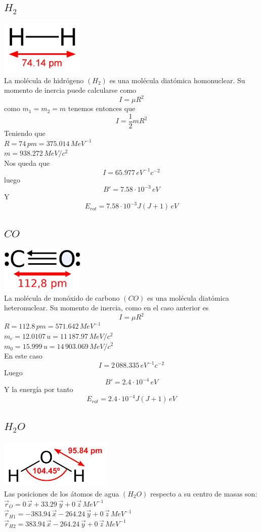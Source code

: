 \documentclass[a4paper]{article}
\begin{document}
\subsection{$H_2$}
\includegraphics[width=0.3\textwidth]{hidrogeno.png}\\
La molécula de hidrógeno $(H_2)$ es una molécula diatómica homonuclear. Su momento de inercia puede calcularse como $$I=\mu R^2$$
como $m_1=m_2=m$ tenemos entonces que $$I=\frac{1}{2}mR^2$$
Teniendo que\\
 $R=74 \, pm=375.014 \, MeV^{-1}$\\
 $m=938.272 \, MeV/c^2$\\
 
 Nos queda que $$I=65.977 \, eV^{-1}c^{-2}$$
 luego 
 $$B'=7.58\cdot 10^{-3}\, eV$$
 Y
 $$E_{rot} = 7.58\cdot 10^{-3}J(J+1)\, eV$$
 \subsection{$CO$}
 \includegraphics[width=0.3\textwidth]{monoxido.png}\\
 La molécula de monóxido de carbono $(CO)$ es una molécula diatómica heteronuclear. Su momento de inercia, como en el caso anterior es $$I=\mu R^2$$
 $R=112.8 \, pm=571.642\, MeV^{-1}$\\
 $m_c=12.0107 \, u=11\, 187.97 \, MeV/c^2$\\
 $m_0=15.999\, u=14\, 903.069\, MeV/c^2$\\
 En este caso 
 $$I= 2\, 088.335\,eV^{-1}c^{-2}$$
 Luego
 $$B'=2.4 \cdot 10^{-4} \, eV$$
 Y la energía por tanto
 $$E_{rot} =2.4 \cdot 10^{-4} J(J+1)\, eV$$
 \subsection{$H_2O$}
 \includegraphics[width=0.4\textwidth]{agua.png}\\
 Las posiciones de los átomos de agua $(H_2O)$ respecto a su centro de masas son:\\
 $\vec r_O = 0\, \vec x + 33.29 \, \vec y + 0 \, \vec z \, MeV^{-1}$\\
 $\vec r_{H1} =-383.94\, \vec x-264.24 \, \vec y + 0 \, \vec z \, MeV^{-1}$\\
 $\vec r_{H2} = 383.94 \, \vec x -264.24 \, \vec y + 0 \, \vec z \, MeV^{-1}$\\
 
\end{document}
